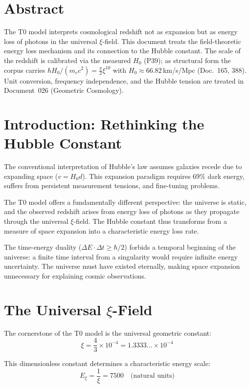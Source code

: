 \section*{Abstract}
	The T0 model interprets cosmological redshift not as expansion but as energy loss of photons in the universal $\xi$-field. This document treats the field-theoretic energy loss mechanism and its connection to the Hubble constant. The scale of the redshift is calibrated via the measured $H_0$ (P39); as structural form the corpus carries $\hbar H_0/(m_ec^2) = \frac{\pi}{2}\xi^{10}$ with $H_0 \approx 66.82\,$km/s/Mpc (Doc.~165, 388). Unit conversion, frequency independence, and the Hubble tension are treated in Document~026 (Geometric Cosmology).


\section{Introduction: Rethinking the Hubble Constant}

	The conventional interpretation of Hubble's law assumes galaxies recede due to expanding space ($v = H_0 d$). This expansion paradigm requires 69\% dark energy, suffers from persistent measurement tensions, and fine-tuning problems.

	The T0 model offers a fundamentally different perspective: the universe is static, and the observed redshift arises from energy loss of photons as they propagate through the universal $\xi$-field. The Hubble constant thus transforms from a measure of space expansion into a characteristic energy loss rate.

	The time-energy duality ($\Delta E \cdot \Delta t \geq \hbar/2$) forbids a temporal beginning of the universe: a finite time interval from a singularity would require infinite energy uncertainty. The universe must have existed eternally, making space expansion unnecessary for explaining cosmic observations.

\section{The Universal $\xi$-Field}

	The cornerstone of the T0 model is the universal geometric constant:
	\begin{equation}
		\xi = \frac{4}{3} \times 10^{-4} = 1.3333\ldots \times 10^{-4}
	\end{equation}

	This dimensionless constant determines a characteristic energy scale:
	\begin{equation}
		E_\xi = \frac{1}{\xi} = 7500 \quad \text{(natural units)}
	\end{equation}


